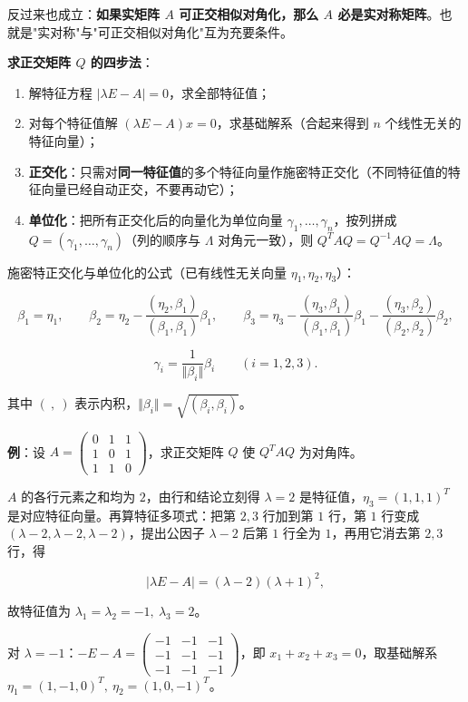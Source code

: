 \documentclass[11pt,openany,UTF8]{ctexbook}
\begin{document}
反过来也成立：\textbf{如果实矩阵 $A$ 可正交相似对角化，那么 $A$ 必是实对称矩阵}。也就是"实对称"与"可正交相似对角化"互为充要条件。

\textbf{求正交矩阵 $Q$ 的四步法}：

\begin{enumerate}
\item 解特征方程 $\vert\lambda E-A\vert=0$，求全部特征值；
\item 对每个特征值解 $(\lambda E-A)x=0$，求基础解系（合起来得到 $n$ 个线性无关的特征向量）；
\item \textbf{正交化}：只需对\textbf{同一特征值}的多个特征向量作施密特正交化（不同特征值的特征向量已经自动正交，不要再动它）；
\item \textbf{单位化}：把所有正交化后的向量化为单位向量 $\gamma_1,\dots,\gamma_n$，按列拼成 $Q=(\gamma_1,\dots,\gamma_n)$（列的顺序与 $\Lambda$ 对角元一致），则 $Q^TAQ=Q^{-1}AQ=\Lambda$。
\end{enumerate}
施密特正交化与单位化的公式（已有线性无关向量 $\eta_1,\eta_2,\eta_3$）：

\[\beta_1=\eta_1,\qquad \beta_2=\eta_2-\frac{(\eta_2,\beta_1)}{(\beta_1,\beta_1)}\beta_1,\qquad \beta_3=\eta_3-\frac{(\eta_3,\beta_1)}{(\beta_1,\beta_1)}\beta_1-\frac{(\eta_3,\beta_2)}{(\beta_2,\beta_2)}\beta_2,\]

\[\gamma_i=\frac{1}{\Vert\beta_i\Vert}\beta_i\qquad(i=1,2,3).\]

其中 $(\ ,\ )$ 表示内积，$\Vert\beta_i\Vert=\sqrt{(\beta_i,\beta_i)}$。

\textbf{例}：设 $A=\begin{pmatrix}0&1&1\\1&0&1\\1&1&0\end{pmatrix}$，求正交矩阵 $Q$ 使 $Q^TAQ$ 为对角阵。

$A$ 的各行元素之和均为 $2$，由行和结论立刻得 $\lambda=2$ 是特征值，$\eta_3=(1,1,1)^T$ 是对应特征向量。再算特征多项式：把第 $2,3$ 行加到第 $1$ 行，第 $1$ 行变成 $(\lambda-2,\lambda-2,\lambda-2)$，提出公因子 $\lambda-2$ 后第 $1$ 行全为 $1$，再用它消去第 $2,3$ 行，得

\[\vert\lambda E-A\vert=(\lambda-2)(\lambda+1)^2,\]

故特征值为 $\lambda_1=\lambda_2=-1,\ \lambda_3=2$。

对 $\lambda=-1$：$-E-A=\begin{pmatrix}-1&-1&-1\\-1&-1&-1\\-1&-1&-1\end{pmatrix}$，即 $x_1+x_2+x_3=0$，取基础解系 $\eta_1=(1,-1,0)^T,\ \eta_2=(1,0,-1)^T$。
\end{document}
